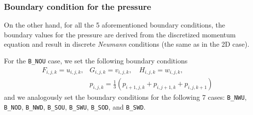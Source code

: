 \documentclass[a4paper, 12pt]{article}
\begin{document}
\subsubsection{Boundary condition for the pressure}\label{sec:boundary_pressure}
On the other hand, for all the 5 aforementioned boundary conditions, the boundary values for the pressure are derived from the discretized 
momentum equation and result in discrete \textit{Neumann} conditions (the same as in the 2D case).

%

For the \texttt{B\_NOU} case, we set the following boundary conditions
\begin{equation}
\begin{array}{ll}
F_{i,j,k} = u_{i,j,k}, & G_{i,j,k} = v_{i,j,k}, \quad H_{i,j,k} = w_{i,j,k}, \\
 & p_{i,j,k} = \frac{1}{3}(p_{i+1,j,k}+p_{i,j+1,k}+p_{i,j,k+1})
\end{array}
\end{equation}
and we analogously set the boundary conditions for the following 7 cases: \texttt{B\_NWU}, \texttt{B\_NOD}, \texttt{B\_NWD}, \texttt{B\_SOU}, \texttt{B\_SWU}, \texttt{B\_SOD}, and \texttt{B\_SWD}.
\end{document}
